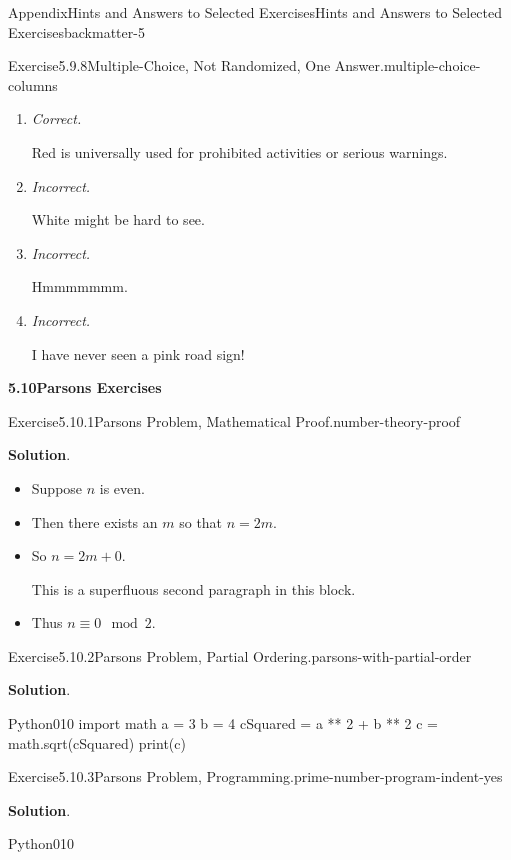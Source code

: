 \documentclass[oneside,10pt,]{book}
\newcommand{\blocktitlefont}{\relax}
\newcommand{\lititle}[1]{{\slshape#1}}
\numberwithin{equation}{section}
\begin{document}
\begin{solutions-chapter}{Appendix}{Hints and Answers to Selected Exercises}{}{Hints and Answers to Selected Exercises}{}{}{backmatter-5}
\begin{divisionsolution}{Exercise}{5.9.8}{Multiple-Choice, Not Randomized, One Answer.}{multiple-choice-columns}
\begin{enumerate}[label={\Alph*.}]
Green means ``go!''.%
\item{}\lititle{Correct.}\par%
Red is universally used for prohibited activities or serious warnings.%
\item{}\lititle{Incorrect.}\par%
White might be hard to see.%
\item{}\lititle{Incorrect.}\par%
Hmmmmmmm.%
\item{}\lititle{Incorrect.}\par%
I have never seen a pink road sign!%
\end{enumerate}
%
\end{divisionsolution}%
\par\medskip
\noindent\textbf{\Large{}5.10\space\textperiodcentered\space{}Parsons Exercises}
\begin{divisionsolution}{Exercise}{5.10.1}{Parsons Problem, Mathematical Proof.}{number-theory-proof}%
\par\smallskip%
\noindent\textbf{\blocktitlefont Solution}.\hypertarget{number-theory-proof-4-back}{}\quad{}%
\begin{itemize}[label=\textbullet]
\item{}Suppose \(n\) is even.%
\item{}Then there exists an \(m\) so that \(n = 2m\).%
\item{}So \(n = 2m + 0\).%
\par
This is a superfluous second paragraph in this block.%
\item{}Thus \(n\equiv 0\mod 2\).%
\end{itemize}
%
\end{divisionsolution}%
\begin{divisionsolution}{Exercise}{5.10.2}{Parsons Problem, Partial Ordering.}{parsons-with-partial-order}%
\par\smallskip%
\noindent\textbf{\blocktitlefont Solution}.\hypertarget{parsons-with-partial-order-3-back}{}\quad{}\begin{program}{Python}{0}{1}{0}
import math
a = 3
b = 4
cSquared = a ** 2 + b ** 2
c = math.sqrt(cSquared)
print(c)
\end{program}
\end{divisionsolution}%
\begin{divisionsolution}{Exercise}{5.10.3}{Parsons Problem, Programming.}{prime-number-program-indent-yes}%
\par\smallskip%
\noindent\textbf{\blocktitlefont Solution}.\hypertarget{prime-number-program-indent-yes-5-back}{}\quad{}\begin{program}{Python}{0}{1}{0}

\end{program}
\end{divisionsolution}
\end{solutions-chapter}
\end{document}
